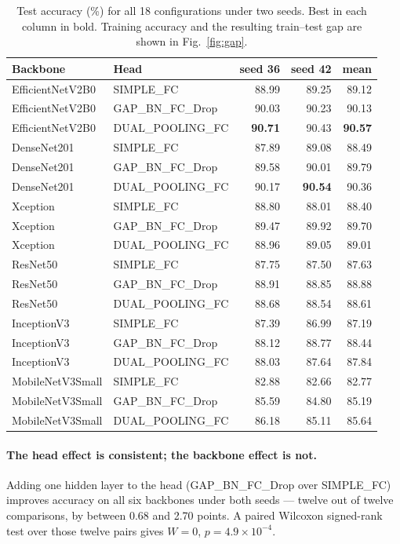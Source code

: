 \documentclass[runningheads]{llncs}
\begin{document}
\begin{table}[tb]
\centering
\caption{Test accuracy (\%) for all 18 configurations under two seeds. Best in
each column in bold. Training accuracy and the resulting train--test gap are
shown in Fig.~\ref{fig:gap}.}
\label{tab:main}
\begin{tabular}{llrrr}
\toprule
Backbone & Head & seed 36 & seed 42 & mean \\
\midrule
EfficientNetV2B0 & SIMPLE\_FC        & 88.99 & 89.25 & 89.12 \\
EfficientNetV2B0 & GAP\_BN\_FC\_Drop & 90.03 & 90.23 & 90.13 \\
EfficientNetV2B0 & DUAL\_POOLING\_FC & \textbf{90.71} & 90.43 & \textbf{90.57} \\
DenseNet201      & SIMPLE\_FC        & 87.89 & 89.08 & 88.49 \\
DenseNet201      & GAP\_BN\_FC\_Drop & 89.58 & 90.01 & 89.79 \\
DenseNet201      & DUAL\_POOLING\_FC & 90.17 & \textbf{90.54} & 90.36 \\
Xception         & SIMPLE\_FC        & 88.80 & 88.01 & 88.40 \\
Xception         & GAP\_BN\_FC\_Drop & 89.47 & 89.92 & 89.70 \\
Xception         & DUAL\_POOLING\_FC & 88.96 & 89.05 & 89.01 \\
ResNet50         & SIMPLE\_FC        & 87.75 & 87.50 & 87.63 \\
ResNet50         & GAP\_BN\_FC\_Drop & 88.91 & 88.85 & 88.88 \\
ResNet50         & DUAL\_POOLING\_FC & 88.68 & 88.54 & 88.61 \\
InceptionV3      & SIMPLE\_FC        & 87.39 & 86.99 & 87.19 \\
InceptionV3      & GAP\_BN\_FC\_Drop & 88.12 & 88.77 & 88.44 \\
InceptionV3      & DUAL\_POOLING\_FC & 88.03 & 87.64 & 87.84 \\
MobileNetV3Small & SIMPLE\_FC        & 82.88 & 82.66 & 82.77 \\
MobileNetV3Small & GAP\_BN\_FC\_Drop & 85.59 & 84.80 & 85.19 \\
MobileNetV3Small & DUAL\_POOLING\_FC & 86.18 & 85.11 & 85.64 \\
\bottomrule
\end{tabular}
\end{table}

\paragraph{The head effect is consistent; the backbone effect is not.}
Adding one hidden layer to the head (GAP\_BN\_FC\_Drop over SIMPLE\_FC) improves
accuracy on all six backbones under both seeds --- twelve out of twelve
comparisons, by between 0.68 and 2.70 points. A paired Wilcoxon signed-rank test
over those twelve pairs gives $W = 0$, $p = 4.9\times10^{-4}$.
\end{document}
